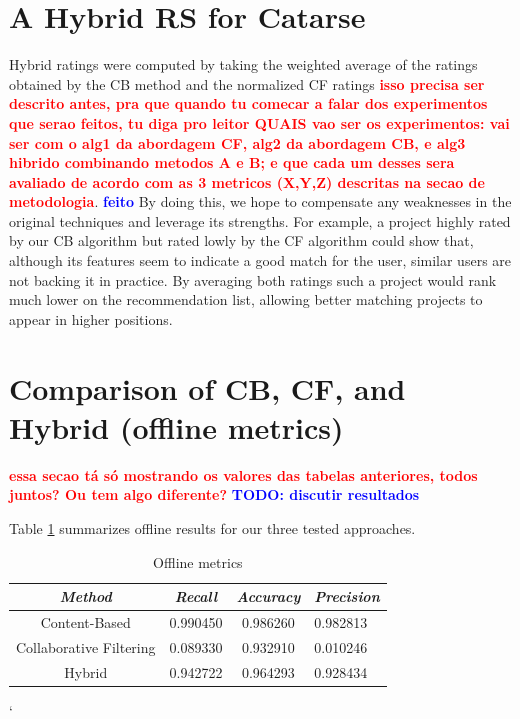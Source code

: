 \documentclass[cic,tc,english]{iiufrgs}
\newcommand{\bruno}[1]{\textcolor{red}{\textbf{#1}}}
\newcommand{\adriano}[1]{\textcolor{blue}{\textbf{#1}}}
\begin{document}
\section{A Hybrid RS for Catarse}
Hybrid ratings were computed by taking the weighted average of the ratings obtained by the CB method and the normalized CF ratings \bruno{isso precisa ser descrito antes, pra que quando tu comecar a falar dos experimentos que serao feitos, tu diga pro leitor QUAIS vao ser os experimentos: vai ser com o alg1 da abordagem CF, alg2 da abordagem CB, e alg3 hibrido combinando metodos A e B; e que cada um desses sera avaliado de acordo com as 3 metricos (X,Y,Z) descritas na secao de metodologia}. \adriano{feito} By doing this, we hope to compensate any weaknesses in the original techniques and leverage its strengths. For example, a project highly rated by our CB algorithm but rated lowly by the CF algorithm could show that, although its features seem to indicate a good match for the user, similar users are not backing it in practice. By averaging both ratings such a project would rank much lower on the recommendation list, allowing better matching projects to appear in higher positions.

\section{Comparison of CB, CF, and Hybrid (offline metrics)}
\bruno{essa secao tá só mostrando os valores das tabelas anteriores, todos juntos? Ou tem algo diferente?} \adriano{TODO: discutir resultados}

Table \ref{tbl:offline_metrics} summarizes offline results for our three tested approaches. 

\begin{table}[ht!]
    \caption{Offline metrics}
    \centering
        \begin{tabular}{c|c|c|p{5cm}}
          \hline
          \textit{Method}  &   \textit{Recall}  &   \textit{Accuracy}  &   \textit{Precision} \\
          \hline
          \hline
          Content-Based           &   0.990450           & 0.986260 &  0.982813 \\
          Collaborative Filtering     & 0.089330             & 0.932910  & 0.010246\\
          Hybrid     & 0.942722             & 0.964293  & 0.928434\\
          \hline
        \end{tabular}`
    \label{tbl:offline_metrics}
\end{table}
\end{document}
